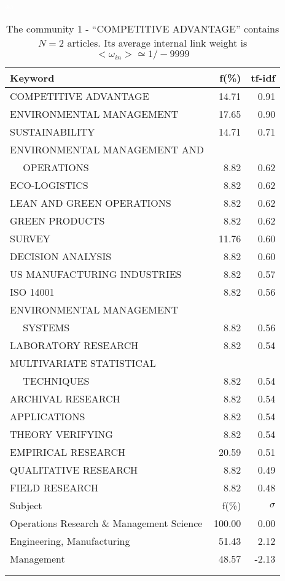 \documentclass[a4paper,11pt]{report}
\begin{document}
\begin{landscape}
\clearpage

\begin{table}[!ht]
\caption{The community 1 - ``COMPETITIVE ADVANTAGE'' contains $N = 2$ articles. Its average internal link weight is $<\omega_{in}> \simeq 1/-9999$ }
\textcolor{white}{aa}\\
{\scriptsize\begin{tabular}{|l r  r|}
\hline
Keyword & f(\%) & tf-idf \\
\hline
COMPETITIVE ADVANTAGE & 14.71 & 0.91\\
ENVIRONMENTAL MANAGEMENT & 17.65 & 0.90\\
SUSTAINABILITY & 14.71 & 0.71\\
ENVIRONMENTAL MANAGEMENT AND &  &\\
$\quad$ OPERATIONS & 8.82 & 0.62\\
ECO-LOGISTICS & 8.82 & 0.62\\
LEAN AND GREEN OPERATIONS & 8.82 & 0.62\\
GREEN PRODUCTS & 8.82 & 0.62\\
SURVEY & 11.76 & 0.60\\
DECISION ANALYSIS & 8.82 & 0.60\\
US MANUFACTURING INDUSTRIES & 8.82 & 0.57\\
ISO 14001 & 8.82 & 0.56\\
ENVIRONMENTAL MANAGEMENT &  &\\
$\quad$ SYSTEMS & 8.82 & 0.56\\
LABORATORY RESEARCH & 8.82 & 0.54\\
MULTIVARIATE STATISTICAL &  &\\
$\quad$ TECHNIQUES & 8.82 & 0.54\\
ARCHIVAL RESEARCH & 8.82 & 0.54\\
APPLICATIONS & 8.82 & 0.54\\
THEORY VERIFYING & 8.82 & 0.54\\
EMPIRICAL RESEARCH & 20.59 & 0.51\\
QUALITATIVE RESEARCH & 8.82 & 0.49\\
FIELD RESEARCH & 8.82 & 0.48\\
\hline
\hline
Subject & f(\%) & $\sigma$\\
\hline
Operations Research \& Management Science & 100.00 & 0.00\\
Engineering, Manufacturing & 51.43 & 2.12\\
Management & 48.57 & -2.13\\
 &  & \\
 &  & \\

\end{tabular}}
\end{table}
\end{landscape}
\end{document}
